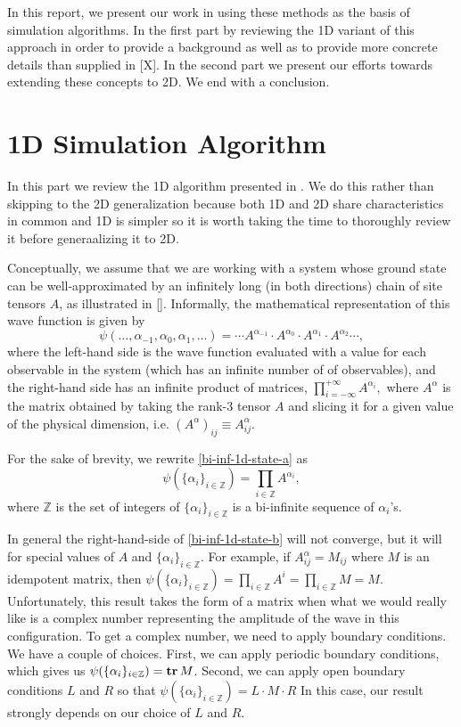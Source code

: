 \documentclass{report}
\newcommand{\tr}{\text{\textbf{tr}}\,}
\newcommand{\Z}{\mathbb{Z}}
\begin{document}
In this report, we present our work in using these methods as the basis of simulation algorithms.  In the first part by reviewing the 1D variant of this approach in order to provide a background as well as to provide more concrete details than supplied in [X].  In the second part we present our efforts towards extending these concepts to 2D.  We end with a conclusion.

\part{1D Simulation Algorithm}
\label{1dsim}

In this part we review the 1D algorithm presented in \cite{Crosswhite2008}.  We do this rather than skipping to the 2D generalization because both 1D and 2D share characteristics in common and 1D is simpler so it is worth taking the time to thoroughly review it before generaalizing it to 2D.

Conceptually, we assume that we are working with a system whose ground state can be well-approximated by an infinitely long (in both directions) chain of site tensors $A$, as illustrated in [].  Informally, the mathematical representation of this wave function is given by
\begin{equation}
\label{bi-inf-1d-state-a}
\psi(\dots,\alpha_{-1},\alpha_{0},\alpha_1,\dots)= \cdots A^{\alpha_{-1}} \cdot A^{\alpha_0}\cdot A^{\alpha_1}\cdot A^{\alpha_2} \cdots,
\end{equation}
where the left-hand side is the wave function evaluated with a value for each observable in the system (which has an infinite number of of observables), and the right-hand side has an infinite product of matrices, $\prod_{i=-\infty}^{+\infty} A^{\alpha_i},$ where $A^{\alpha}$ is the matrix obtained by taking the rank-3 tensor $A$ and slicing it for a given value of the physical dimension, i.e. $(A^\alpha)_{ij}\equiv A^\alpha_{ij}$.

For the sake of brevity, we rewrite \ref{bi-inf-1d-state-a} as
\begin{equation}
\label{bi-inf-1d-state-b}
\psi(\{\alpha_i\}_{i\in\Z}) = \prod_{i\in\Z} A^{\alpha_i},
\end{equation}
where $\Z$ is the set of integers of $\{\alpha_i\}_{i\in\Z}$ is a bi-infinite sequence of $\alpha_i$'s.

In general the right-hand-side of \ref{bi-inf-1d-state-b} will not converge, but it will for special values of $A$ and $\{\alpha_i\}_{i\in\Z}$.  For example, if $A^\alpha_{ij}=M_{ij}$ where $M$ is an idempotent matrix, then $\psi(\{\alpha_i\}_{i\in\Z})=\prod_{i\in\Z} A^i = \prod_{i\in\Z} M = M$.  Unfortunately, this result takes the form of a matrix when what we would really like is a complex number representing the amplitude of the wave in this configuration.  To get a complex number, we need to apply boundary conditions.  We have a couple of choices.  First, we can apply periodic boundary conditions, which gives us $\psi(\{\alpha_i\}_{i\in\Z})=\tr M$.  Second, we can apply open boundary conditions $L$ and $R$ so that $\psi(\{\alpha_i\}_{i\in\Z})=L\cdot M\cdot R$  In this case, our result strongly depends on our choice of $L$ and $R$.
\end{document}
